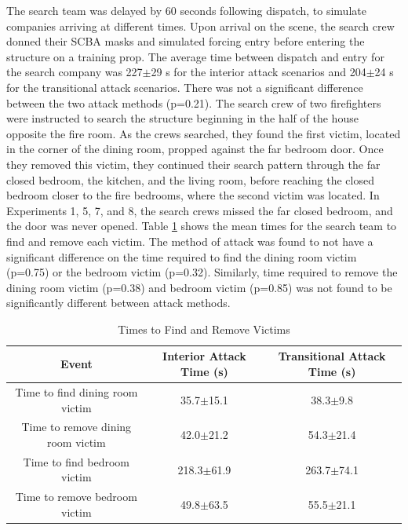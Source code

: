 \documentclass[12pt,oneside]{article}
\begin{document}
The search team was delayed by 60 seconds following dispatch, to simulate companies arriving at different times. Upon arrival on the scene, the search crew donned their SCBA masks and simulated forcing entry before entering the structure on a training prop. The average time between dispatch and entry for the search company was 227$\pm$29 s for the interior attack scenarios and 204$\pm$24 s for the transitional attack scenarios. There was not a significant difference between the two attack methods (p=0.21). The search crew of two firefighters were instructed to search the structure beginning in the half of the house opposite the fire room. As the crews searched, they found the first victim, located in the corner of the dining room, propped against the far bedroom door. Once they removed this victim, they continued their search pattern through the far closed bedroom, the kitchen, and the living room, before reaching the closed bedroom closer to the fire bedrooms, where the second victim was located. In Experiments 1, 5, 7, and 8, the search crews missed the far closed bedroom, and the door was never opened. Table \ref{tab:victim_times} shows the mean times for the search team to find and remove each victim. The method of attack was found to not have a significant difference on the time required to find the dining room victim (p=0.75) or the bedroom victim (p=0.32). Similarly, time required to remove the dining room victim (p=0.38) and bedroom victim (p=0.85) was not found to be significantly different between attack methods. 

\begin{table}[!ht]
    \centering
    \caption{Times to Find and Remove Victims}
    \label{tab:victim_times}
    \begin{tabular}{ccc}
    \toprule[1.5pt]
 	 Event&								Interior Attack Time (s)&	Transitional Attack Time (s)\\
 	\midrule 
  	Time to find dining room victim&	35.7$\pm$15.1&				38.3$\pm$9.8\\
  	Time to remove dining room victim&	42.0$\pm$21.2&				54.3$\pm$21.4\\
  	Time to find bedroom victim&		218.3$\pm$61.9&				263.7$\pm$74.1\\
  	Time to remove bedroom victim&		49.8$\pm$63.5&				55.5$\pm$21.1\\
 	\bottomrule[1.25pt] 
    \end{tabular}
\end{table}
\end{document}
